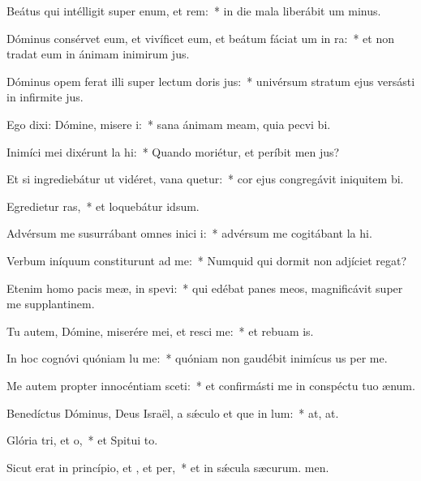 \item Beátus qui intélligit super enum, et rem:~* in die mala liberábit um minus.
\item Dóminus consérvet eum, et vivíficet eum, et beátum fáciat um in ra:~* et non tradat eum in ánimam inimirum jus.
\item Dóminus opem ferat illi super lectum doris jus:~* univérsum stratum ejus versásti in infirmite jus.
\item Ego dixi: Dómine, misere i:~* sana ánimam meam, quia pecvi bi.
\item Inimíci mei dixérunt la hi:~* Quando moriétur, et períbit men jus?
\item Et si ingrediebátur ut vidéret, vana quetur:~* cor ejus congregávit iniquitem bi.
\item Egredietur ras,~* et loquebátur  idsum.
\item Advérsum me susurrábant omnes inici i:~* advérsum me cogitábant la hi.
\item Verbum iníquum constiturunt ad me:~* Numquid qui dormit non adjíciet  regat?
\item Etenim homo pacis meæ, in  spevi:~* qui edébat panes meos, magnificávit super me supplantinem.
\item Tu autem, Dómine, miserére mei, et resci me:~* et rebuam is.
\item In hoc cognóvi quóniam lu me:~* quóniam non gaudébit inimícus us per me.
\item Me autem propter innocéntiam sceti:~* et confirmásti me in conspéctu tuo  ænum.
\item Benedíctus Dóminus, Deus Israël, a sǽculo et que in lum:~* at, at.
\item Glória tri, et o,~* et Spitui to.
\item Sicut erat in princípio, et , et per,~* et in sǽcula sæcurum. men.
